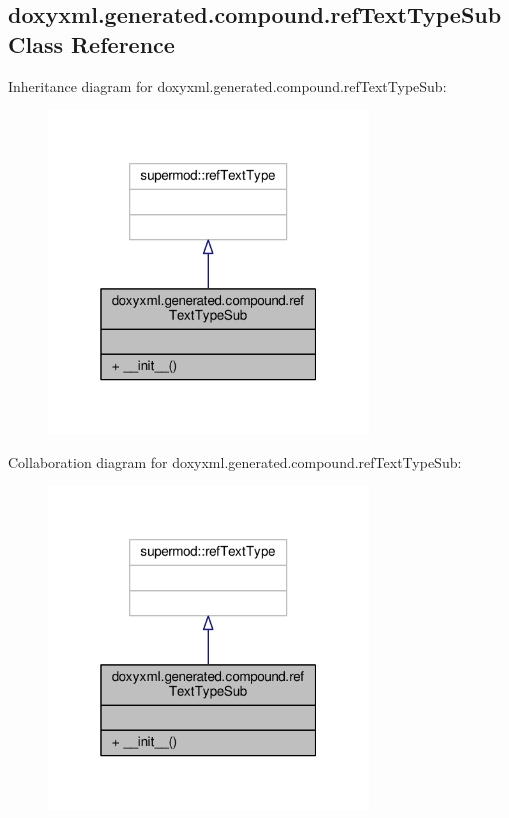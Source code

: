 \subsection{doxyxml.\+generated.\+compound.\+ref\+Text\+Type\+Sub Class Reference}
\label{classdoxyxml_1_1generated_1_1compound_1_1refTextTypeSub}


Inheritance diagram for doxyxml.\+generated.\+compound.\+ref\+Text\+Type\+Sub\+:
\nopagebreak
\begin{figure}[H]
\begin{center}
\leavevmode
\includegraphics[width=241pt]{d6/d13/classdoxyxml_1_1generated_1_1compound_1_1refTextTypeSub__inherit__graph}
\end{center}
\end{figure}


Collaboration diagram for doxyxml.\+generated.\+compound.\+ref\+Text\+Type\+Sub\+:
\nopagebreak
\begin{figure}[H]
\begin{center}
\leavevmode
\includegraphics[width=241pt]{db/d98/classdoxyxml_1_1generated_1_1compound_1_1refTextTypeSub__coll__graph}
\end{center}
\end{figure}
